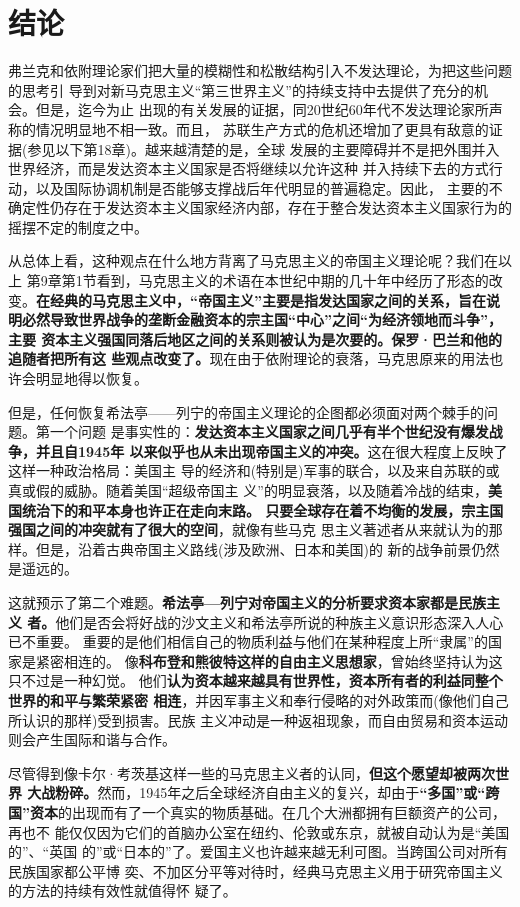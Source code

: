 \section{结论}

弗兰克和依附理论家们把大量的模糊性和松散结构引入不发达理论，为把这些问题的思考引
导到对新马克思主义“第三世界主义”的持续支持中去提供了充分的机会。但是，迄今为止
出现的有关发展的证据，同20世纪60年代不发达理论家所声称的情况明显地不相一致。而且，
苏联生产方式的危机还增加了更具有敌意的证据(参见以下第18章)。越来越清楚的是，全球
发展的主要障碍并不是把外围并入世界经济，而是发达资本主义国家是否将继续以允许这种
并入持续下去的方式行动，以及国际协调机制是否能够支撑战后年代明显的普遍稳定。因此，
主要的不确定性仍存在于发达资本主义国家经济内部，存在于整合发达资本主义国家行为的
摇摆不定的制度之中。

从总体上看，这种观点在什么地方背离了马克思主义的帝国主义理论呢？我们在以上
第9章第1节看到，马克思主义的术语在本世纪中期的几十年中经历了形态的改
变。\textbf{在经典的马克思主义中，“帝国主义”主要是指发达国家之间的关系，旨在说
  明必然导致世界战争的垄断金融资本的宗主国“中心”之间“为经济领地而斗争”，主要
  资本主义强国同落后地区之间的关系则被认为是次要的。保罗·巴兰和他的追随者把所有这
  些观点改变了。}现在由于依附理论的衰落，马克思原来的用法也许会明显地得以恢复。

但是，任何恢复希法亭——列宁的帝国主义理论的企图都必须面对两个棘手的问题。第一个问题
是事实性的：\textbf{发达资本主义国家之间几乎有半个世纪没有爆发战争，并且自1945年
  以来似乎也从未出现帝国主义的冲突。}这在很大程度上反映了这样一种政治格局：美国主
导的经济和(特别是)军事的联合，以及来自苏联的或真或假的威胁。随着美国“超级帝国主
义”的明显衰落，以及随着冷战的结束，\textbf{美国统治下的和平本身也许正在走向末路。
  只要全球存在着不均衡的发展，宗主国强国之间的冲突就有了很大的空间}，就像有些马克
思主义著述者从来就认为的那样。但是，沿着古典帝国主义路线(涉及欧洲、日本和美国)的
新的战争前景仍然是遥远的。

这就预示了第二个难题。\textbf{希法亭—列宁对帝国主义的分析要求资本家都是民族主义
  者。}他们是否会将好战的沙文主义和希法亭所说的种族主义意识形态深入人心已不重要。
重要的是他们相信自己的物质利益与他们在某种程度上所“隶属”的国家是紧密相连的。
像\textbf{科布登和熊彼特这样的自由主义思想家}，曾始终坚持认为这只不过是一种幻觉。
他们\textbf{认为资本越来越具有世界性，资本所有者的利益同整个世界的和平与繁荣紧密
  相连}，并因军事主义和奉行侵略的对外政策而(像他们自己所认识的那样)受到损害。民族
主义冲动是一种返祖现象，而自由贸易和资本运动则会产生国际和谐与合作。

尽管得到像卡尔·考茨基这样一些的马克思主义者的认同，\textbf{但这个愿望却被两次世界
  大战粉碎。}然而，1945年之后全球经济自由主义的复兴，却由于\textbf{“多国”或“跨
  国”资本}的出现而有了一个真实的物质基础。在几个大洲都拥有巨额资产的公司，再也不
能仅仅因为它们的首脑办公室在纽约、伦敦或东京，就被自动认为是“美国的”、“英国
的”或“日本的”了。爱国主义也许越来越无利可图。当跨国公司对所有民族国家都公平博
奕、不加区分平等对待时，经典马克思主义用于研究帝国主义的方法的持续有效性就值得怀
疑了。



